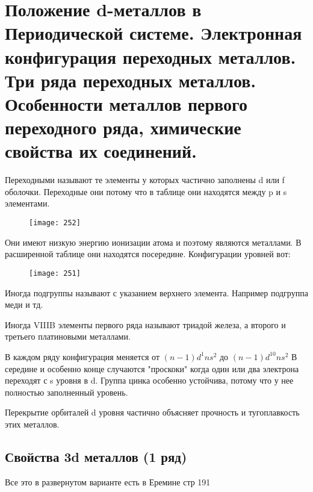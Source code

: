 \section{Положение d-металлов в Периодической системе. Электронная конфигурация переходных металлов. Три ряда переходных металлов. Особенности металлов первого переходного ряда, химические свойства их соединений.}
	Переходными называют те элементы у которых частично заполнены d или f оболочки.	Переходные они потому что в таблице они находятся между p и s элементами.
	\begin{figure}[H]
		\texttt{[image: 252]}
	\end{figure}
	Они имеют низкую энергию ионизации атома и поэтому являются металлами. В расширенной таблице они находятся посередине. Конфигурации уровней вот:
	\begin{figure}[H]
		\texttt{[image: 251]}
	\end{figure}
Иногда подгруппы называют с указанием верхнего элемента. Например подгруппа меди и тд.

Иногда VIIIB элементы первого ряда называют триадой железа, а второго и третьего платиновыми металлами. 

В каждом ряду конфигурация меняется от $(n- 1)d^1 n s^2 $ до $(n- 1)d^{10} n s^2 $ В середине и особенно конце случаются "проскоки" когда один или два электрона переходят с s уровня в d. Группа цинка особенно устойчива, потому что у нее полностью заполненный уровень. 

Перекрытие орбиталей d уровня частично объясняет прочность и тугоплавкость этих металлов. 
\subsection{Свойства 3d металлов (1 ряд)}
Все это в развернутом варианте есть в Еремине  стр 191


